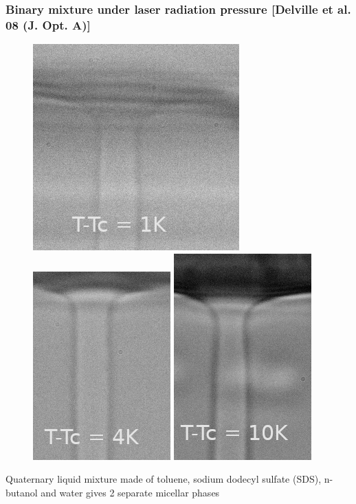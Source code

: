 \documentclass[9pt, dvipsnames]{beamer} %
\begin{document}
\begin{frame}
    \frametitle{Binary mixture under laser radiation pressure [Delville et al. 08 (J. Opt. A)]}
    \centering
    \begin{figure}
    	\includegraphics[width=0.3\linewidth]{raph-1k.png}
    	\includegraphics[width=0.3\linewidth]{raph-4k.png}
    	\includegraphics[width=0.3\linewidth]{raph-10k.png}    	    	
    \end{figure}
    {\small Quaternary liquid mixture made of toluene, sodium dodecyl sulfate (SDS), n-butanol and water gives 2 separate micellar phases } \\
\end{frame}
\end{document}
